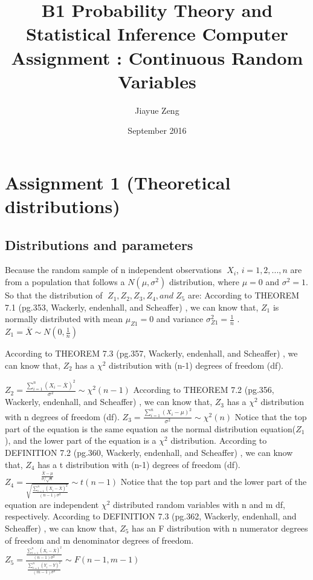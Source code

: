 \documentclass[a4paper,11pt,fleqn]{article}
\title{B1 Probability Theory and Statistical Inference Computer Assignment : Continuous Random Variables}
\author{Jiayue Zeng }
\date{September 2016}
\begin{document}
\maketitle

\section{Assignment 1 (Theoretical distributions)}
\subsection{Distributions and parameters}
Because the random sample of n independent observations $\; X_i$, $  i=1,2,...,n $ are from a population that follows a  $N(\mu,\sigma^2)$ distribution, where $\mu = 0 $ 
and $ \sigma^2 = 1$. 
So that the distribution of $\;Z_1, Z_2, Z_3, Z_4, and \;Z_5 $ are:
\vskip 0.5cm
According to THEOREM 7.1 (pg.353, Wackerly, endenhall, and Scheaffer) , we can know that, $Z_1$ is normally distributed with mean $\mu_{Z1}=0$ and variance $\sigma^2_{Z1}=\frac{1}{n}$ .
\vskip 0.5cm
$Z_1 = \overline{X} 
\sim N(0,\frac{1}{n}) $

\vskip 0.5cm
According to THEOREM 7.3 (pg.357, Wackerly, endenhall, and Scheaffer) , we can know that, $Z_2$ has a $\chi^2$ distribution with (n-1) degrees of freedom (df).

\vskip 0.5cm
$
Z_2 = \frac{\sum_{i=1}^{n}(X_{i}-\overline{X})^2}{\sigma^2}
\sim \chi^2(n-1)
$
\vskip 0.5cm
According to THEOREM 7.2 (pg.356, Wackerly, endenhall, and Scheaffer) , we can know that, $Z_3$ has a $\chi^2$ distribution with n degrees of freedom (df).
\vskip 0.5cm
$
Z_3 = \frac{\sum_{i=1}^{n}(X_i-\mu)^2}{\sigma^2}
\sim \chi^2(n) 
$
\vskip 0.5cm
Notice that the top part of the equation is the same equation as the normal distribution equation($Z_1$), and the lower part of the equation is a $\chi^2$ distribution. According to DEFINITION 7.2 (pg.360, Wackerly, endenhall, and Scheaffer) , we can know that, $Z_4$ has a t distribution with (n-1) degrees of freedom (df).
\vskip 0.5cm
$
Z_4 = \frac{\frac{\overline{X}-\mu}{\sigma/\sqrt{n}}}{\sqrt{\frac{\sum_{i=1}^{n}(X_i-\overline{X})^2}{(n-1)\sigma^2}}}
\sim  t(n-1)
$
\vskip 0.5cm
Notice that the top part and the lower part of the equation are independent $\chi^2$ distributed random variables with n and m df, respectively. According to DEFINITION 7.3 (pg.362, Wackerly, endenhall, and Scheaffer) , we can know that, $Z_5$ has an F distribution with n numerator degrees of freedom and m denominator degrees of freedom.
\vskip 0.5cm
$
Z_5 = \frac{\frac{\sum_{i=1}^{n}(X_i-\overline{X})^2}{(n-1)\sigma^2}}{\frac{\sum_{i=1}^{n}(Y_i-\overline{Y})^2}{(m-1)\sigma^2}}
\sim F(n-1,m-1) 
$
\vskip 0.7cm
\end{document}
